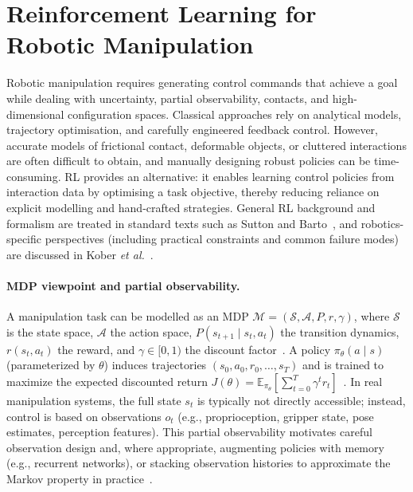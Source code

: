 \section{Reinforcement Learning for Robotic Manipulation}
\label{sec:rl_manipulation}
%


Robotic manipulation requires generating control commands that achieve a goal while dealing with uncertainty,
partial observability, contacts, and high-dimensional configuration spaces. Classical approaches rely on analytical
models, trajectory optimisation, and carefully engineered feedback control. However, accurate models of frictional
contact, deformable objects, or cluttered interactions are often difficult to obtain, and manually designing robust
policies can be time-consuming. \ac{RL} provides an alternative: it enables learning control
policies from interaction data by optimising a task objective, thereby reducing reliance on explicit modelling and
hand-crafted strategies. General \ac{RL} background and formalism are treated in standard texts such as Sutton and
Barto~\cite{SuttonBarto2018}, and robotics-specific perspectives (including practical constraints and common failure
modes) are discussed in Kober \emph{et al.}~\cite{Kober2013Survey}.

\paragraph{MDP viewpoint and partial observability.}
A manipulation task can be modelled as an \ac{MDP}
$\mathcal{M} = (\mathcal{S}, \mathcal{A}, P, r, \gamma)$, where $\mathcal{S}$ is the state space,
$\mathcal{A}$ the action space, $P(s_{t+1}\mid s_t,a_t)$ the transition dynamics, $r(s_t,a_t)$ the reward,
and $\gamma \in [0,1)$ the discount factor~\cite{SuttonBarto2018}.
A policy $\pi_\theta(a\mid s)$ (parameterized by $\theta$) induces trajectories
$(s_0,a_0,r_0,\ldots,s_T)$ and is trained to maximize the expected discounted return
$J(\theta)=\mathbb{E}_{\pi_\theta}\!\left[\sum_{t=0}^{T}\gamma^t r_t\right]$~\cite{SuttonBarto2018}.
In real manipulation systems, the full state $s_t$ is typically not directly accessible; instead, control is based on
observations $o_t$ (e.g., proprioception, gripper state, pose estimates, perception features). This partial observability
motivates careful observation design and, where appropriate, augmenting policies with memory (e.g., recurrent networks),
or stacking observation histories to approximate the Markov property in practice~\cite{Kober2013Survey}.


